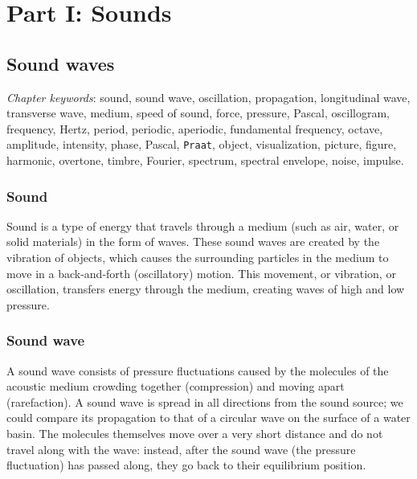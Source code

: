 \documentclass[
]{book}
\begin{document}
\part*{Part I: Sounds}\label{part-part-i-sounds}

\chapter{Sound waves}\label{ch-soundwaves}

\emph{Chapter keywords}: sound, sound wave, oscillation, propagation, longitudinal wave, transverse wave, medium, speed of sound, force, pressure, Pascal, oscillogram, frequency, Hertz, period, periodic, aperiodic, fundamental frequency, octave, amplitude, intensity, phase, Pascal, \texttt{Praat}, object, visualization, picture, figure, harmonic, overtone, timbre, Fourier, spectrum, spectral envelope, noise, impulse.

\section{Sound}\label{sound}

Sound is a type of energy that travels through a medium (such as air, water, or solid materials) in the form of waves. These sound waves are created by the vibration of objects, which causes the surrounding particles in the medium to move in a back-and-forth (oscillatory) motion. This movement, or vibration, or oscillation, transfers energy through the medium, creating waves of high and low pressure.

\section{Sound wave}\label{sec:soundwave}

A sound wave consists of pressure fluctuations caused by the molecules of the acoustic medium crowding together (compression) and moving apart (rarefaction). A sound wave is spread in all directions from the sound source; we could compare its propagation to that of a circular wave on the surface of a water basin. The molecules themselves move over a very short distance and do not travel along with the wave: instead, after the sound wave (the pressure fluctuation) has passed along, they go back to their equilibrium position.
\end{document}
